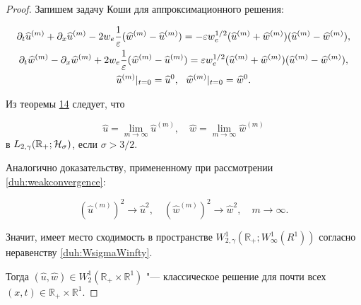 \begin{proof}

Запишем задачу Коши для аппроксимационного решения:

\begin{gather}

\pa_t\widehat{u}^{(m)}+\pa_x\widehat{u}^{(m)}-2w_e\frac1\ve(\widehat{w}^{(m)}

-\widehat{u}^{(m)})=-\ve w_e^{1/2}(\widehat{u}^{(m)}+\widehat{w}^{(m)})(\widehat{u}^{(m)}-\widehat{w}^{(m)}),  

\\

\pa_t\widehat{w}^{(m)}-\pa_x\widehat{w}^{(m)}+2w_e\frac1\ve(\widehat{w}^{(m)}

-\widehat{u}^{(m)})=\ve w_e^{1/2}(\widehat{u}^{(m)}+\widehat{w}^{(m)})(\widehat{u}^{(m)}-\widehat{w}^{(m)}),

\\

\widehat{u}^{(m)}|_{t=0}=\widehat{u}^0,~~\widehat{w}^{(m)}|_{t=0}=\widehat{w}^0.

\label{duh:appsystem}

\end{gather}

Из теоремы \hyperlink{dukh:th14}{14} следует, что 

$$\widehat{u}=\lim\limits_{m \to \infty}\widehat{u}^{(m)},\quad  \widehat{w}=\lim\limits_{m \to \infty}\widehat{w}^{(m)}$$ в $L_{2,\gamma}(\mathbb R_{+}; {\cal H}_\sigma)$, если $\sigma>3/2$. 

Аналогично доказательству, примененному при рассмотрении \eqref{duh:weakconvergence}:

$$(\widehat{u}^{(m)})^2\to \widehat{u}^2,\quad  (\widehat{w}^{(m)})^2\to \widehat{w}^2,\quad m\to \infty.$$ 

Значит, имеет место сходимость в пространстве $W^1_{2,\gamma}(\mathbb R_{+}; W^1_\infty(R^1))$ согласно неравенству \eqref{duh:WsigmaWinfty}. 

Тогда $(\widehat{u}, \widehat{w})\in W^1_2(\mathbb R_{+}\times \mathbb R^1)$ "--- классическое решение для почти всех $(x,t)\in \mathbb  R_{+}\times \mathbb R^1$.

\end{proof}





